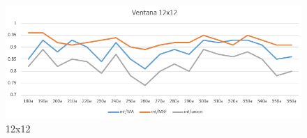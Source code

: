\begin{figure}[h!]
    \includegraphics[width=\textwidth]{Imagenes/filter 12x12.png}
     \hfill
     \caption{12x12}
    \label{filter12x12}
\end{figure}
